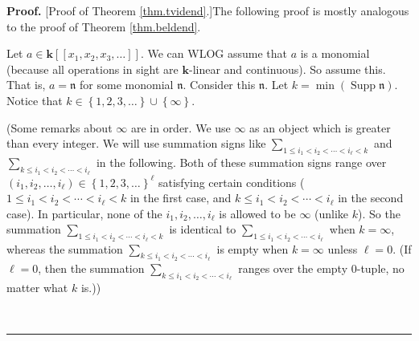 \documentclass
[numbers=enddot,12pt,final,onecolumn,notitlepage,abstracton]{scrartcl}%
\theoremstyle{definition}
\newenvironment{proof}[1][Proof]{\noindent\textbf{#1.} }{\ \rule{0.5em}{0.5em}}
\newenvironment{verlong}{}{}
\let\sumnonlimits\sum
\renewcommand{\sum}{\sumnonlimits\limits}
\begin{document}
\begin{verlong}
\begin{proof}
[Proof of Theorem \ref{thm.tvidend}.]The following proof is mostly analogous
to the proof of Theorem \ref{thm.beldend}.

Let $a\in\mathbf{k}\left[  \left[  x_{1},x_{2},x_{3},\ldots\right]  \right]
$. We can WLOG assume that $a$ is a monomial (because all operations in sight
are $\mathbf{k}$-linear and continuous). So assume this. That is,
$a=\mathfrak{n}$ for some monomial $\mathfrak{n}$. Consider this
$\mathfrak{n}$. Let $k=\min\left(  \operatorname*{Supp}\mathfrak{n}\right)  $.
Notice that $k\in\left\{  1,2,3,\ldots\right\}  \cup\left\{  \infty\right\}  $.

(Some remarks about $\infty$ are in order. We use $\infty$ as an object which
is greater than every integer. We will use summation signs like $\sum_{1\leq
i_{1}<i_{2}<\cdots<i_{\ell}<k}$ and $\sum_{k\leq i_{1}<i_{2}<\cdots<i_{\ell}}$
in the following. Both of these summation signs range over $\left(
i_{1},i_{2},\ldots,i_{\ell}\right)  \in\left\{  1,2,3,\ldots\right\}  ^{\ell}$
satisfying certain conditions ($1\leq i_{1}<i_{2}<\cdots<i_{\ell}<k$ in the
first case, and $k\leq i_{1}<i_{2}<\cdots<i_{\ell}$ in the second case). In
particular, none of the $i_{1},i_{2},\ldots,i_{\ell}$ is allowed to be
$\infty$ (unlike $k$). So the summation $\sum_{1\leq i_{1}<i_{2}%
<\cdots<i_{\ell}<k}$ is identical to $\sum_{1\leq i_{1}<i_{2}<\cdots<i_{\ell}%
}$ when $k=\infty$, whereas the summation $\sum_{k\leq i_{1}<i_{2}%
<\cdots<i_{\ell}}$ is empty when $k=\infty$ unless $\ell=0$. (If $\ell=0$,
then the summation $\sum_{k\leq i_{1}<i_{2}<\cdots<i_{\ell}}$ ranges over the
empty $0$-tuple, no matter what $k$ is.))


\end{proof}
\end{verlong}
\end{document}
